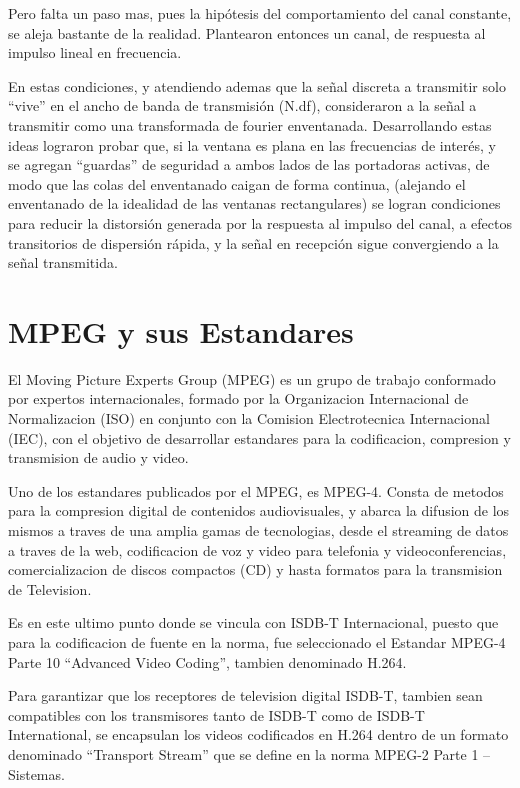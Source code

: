 Pero falta un paso mas, pues la hipótesis del comportamiento del canal constante, se aleja bastante de la realidad. Plantearon entonces un canal, de respuesta al impulso lineal en frecuencia.

En estas condiciones, y atendiendo ademas que la señal discreta a transmitir solo “vive” en el ancho de banda de transmisión (N.df), consideraron a la señal a transmitir como una transformada de fourier enventanada. Desarrollando estas ideas lograron probar que, si la ventana es plana en las frecuencias de interés, y se agregan “guardas” de seguridad a ambos lados de las portadoras activas, de modo que las colas del enventanado caigan de forma continua, (alejando el enventanado de la idealidad de las ventanas rectangulares) se logran condiciones para reducir la distorsión generada por la respuesta al impulso del canal, a efectos transitorios de dispersión rápida, y la señal en recepción sigue convergiendo a la señal transmitida.

\section{MPEG y sus Estandares}

El Moving Picture Experts Group (MPEG)\cite{MPEG} es un grupo de trabajo conformado por expertos internacionales, formado por la Organizacion Internacional de Normalizacion (ISO) en conjunto con la Comision Electrotecnica Internacional (IEC), con el objetivo de desarrollar estandares para la codificacion, compresion y transmision de audio y video.

Uno de los estandares publicados por el MPEG, es MPEG-4. Consta de metodos para la compresion digital de contenidos audiovisuales,  y abarca la difusion de los mismos a traves de una amplia gamas de tecnologias, desde el streaming de datos a traves de la web, codificacion de voz y video para telefonia y videoconferencias, comercializacion de discos compactos (CD) y hasta formatos para la transmision de Television. 

Es en este ultimo punto donde se vincula con ISDB-T Internacional, puesto que para la codificacion de fuente en la norma, fue seleccionado el Estandar MPEG-4 Parte 10 “Advanced Video Coding”, tambien denominado H.264.

Para garantizar que los receptores de television digital ISDB-T, tambien sean compatibles con los transmisores tanto de ISDB-T como de ISDB-T International, se encapsulan los videos codificados en H.264 dentro de un formato denominado “Transport Stream” que se define en la norma MPEG-2 Parte 1 – Sistemas.

